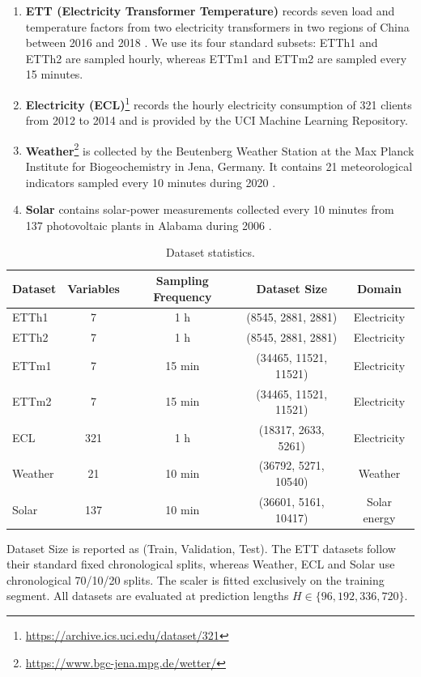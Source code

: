 \documentclass[final,3p,times]{elsarticle}
\begin{document}
\begin{enumerate}
\item \textbf{ETT (Electricity Transformer Temperature)} records seven load and temperature factors from two electricity transformers in two regions of China between 2016 and 2018 \citep{zhou2021informer}. We use its four standard subsets: ETTh1 and ETTh2 are sampled hourly, whereas ETTm1 and ETTm2 are sampled every 15 minutes.
\item \textbf{Electricity (ECL)}\footnote{\url{https://archive.ics.uci.edu/dataset/321}} records the hourly electricity consumption of 321 clients from 2012 to 2014 and is provided by the UCI Machine Learning Repository.
\item \textbf{Weather}\footnote{\url{https://www.bgc-jena.mpg.de/wetter/}} is collected by the Beutenberg Weather Station at the Max Planck Institute for Biogeochemistry in Jena, Germany. It contains 21 meteorological indicators sampled every 10 minutes during 2020 \citep{wu2023timesnet}.
\item \textbf{Solar} contains solar-power measurements collected every 10 minutes from 137 photovoltaic plants in Alabama during 2006 \citep{lai2018lstnet}.
\end{enumerate}

\begin{table}[t]
\centering
\caption{Dataset statistics.}
\label{tab:dataset-statistics}
\scriptsize
\setlength{\tabcolsep}{4pt}
\begin{tabular}{lcccc}
\toprule
Dataset & Variables & Sampling Frequency & Dataset Size & Domain \\
\midrule
ETTh1 & 7 & 1 h & (8545, 2881, 2881) & Electricity \\
ETTh2 & 7 & 1 h & (8545, 2881, 2881) & Electricity \\
ETTm1 & 7 & 15 min & (34465, 11521, 11521) & Electricity \\
ETTm2 & 7 & 15 min & (34465, 11521, 11521) & Electricity \\
ECL & 321 & 1 h & (18317, 2633, 5261) & Electricity \\
Weather & 21 & 10 min & (36792, 5271, 10540) & Weather \\
Solar & 137 & 10 min & (36601, 5161, 10417) & Solar energy \\
\bottomrule
\end{tabular}
\end{table}


Dataset Size is reported as (Train, Validation, Test). The ETT datasets follow their standard fixed chronological splits, whereas Weather, ECL and Solar use chronological 70/10/20 splits. The scaler is fitted exclusively on the training segment. All datasets are evaluated at prediction lengths $H\in\{96,192,336,720\}$.
\end{document}
